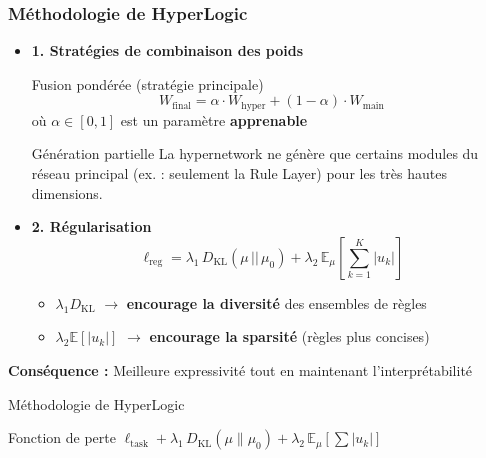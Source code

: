 \documentclass{beamer}
\begin{document}
\begin{frame}
\frametitle{Méthodologie de HyperLogic}

\begin{itemize}
    \item \textbf{1. Stratégies de combinaison des poids}
    
    \begin{block}{Fusion pondérée (stratégie principale)}
    $$
    W_{\text{final}} = \alpha \cdot W_{\text{hyper}} + (1 - \alpha) \cdot W_{\text{main}}
    $$
    où $\alpha \in [0,1]$ est un paramètre \textbf{apprenable}
    \end{block}
    
    \vspace{0.2cm}
    
    \begin{block}{Génération partielle}
    La hypernetwork ne génère que certains modules du réseau principal (ex. : seulement la Rule Layer) pour les très hautes dimensions.
    \end{block}

    \item \textbf{2. Régularisation}
    $$
    \ell_{\text{reg}} = \lambda_1 \, D_{\text{KL}}(\mu \, || \, \mu_0) + \lambda_2 \, \mathbb{E}_{\mu}\left[ \sum_{k=1}^K |u_k| \right]
    $$
    
    \begin{itemize}
        \item $\lambda_1 D_{\text{KL}}$ $\rightarrow$ \textbf{encourage la diversité} des ensembles de règles
        \item $\lambda_2 \mathbb{E}[|u_k|]$ $\rightarrow$ \textbf{encourage la sparsité} (règles plus concises)
    \end{itemize}
\end{itemize}


\begin{center}
\textbf{Conséquence :} Meilleure expressivité tout en maintenant l'interprétabilité
\end{center}

\end{frame}

\begin{frame}{Méthodologie de HyperLogic}
    \begin{block}{Fonction de perte}
$\ell_{\text{task}} + \lambda_1 \, D_{\text{KL}}(\mu \| \mu_0) + \lambda_2 \, \mathbb{E}_\mu \left[ \sum |u_k| \right]$
\end{block}
\end{frame}
\end{document}
